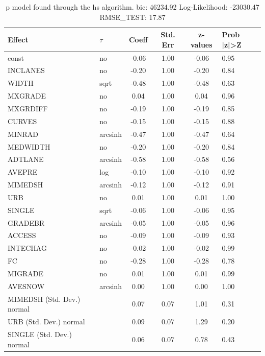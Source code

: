 \begin{table}
	\caption{p model found through the hs algorithm. bic: 46234.92 Log-Likelihood: -23030.47 RMSE_TEST: 17.87}
	\begin{center}
		\begin{tabular}{|l|l|c|c|c|l|}
			\hline
			Effect & $\tau$ & Coeff & Std. Err & z-values & Prob |z|>Z \\
			\hline
			const & no & -0.06 & 1.00 & -0.06 & 0.95 \\
			\hline
			INCLANES & no & -0.20 & 1.00 & -0.20 & 0.84 \\
			\hline
			WIDTH & sqrt & -0.48 & 1.00 & -0.48 & 0.63 \\
			\hline
			MXGRADE & no & 0.04 & 1.00 & 0.04 & 0.96 \\
			\hline
			MXGRDIFF & no & -0.19 & 1.00 & -0.19 & 0.85 \\
			\hline
			CURVES & no & -0.15 & 1.00 & -0.15 & 0.88 \\
			\hline
			MINRAD & arcsinh & -0.47 & 1.00 & -0.47 & 0.64 \\
			\hline
			MEDWIDTH & no & -0.20 & 1.00 & -0.20 & 0.84 \\
			\hline
			ADTLANE & arcsinh & -0.58 & 1.00 & -0.58 & 0.56 \\
			\hline
			AVEPRE & log & -0.10 & 1.00 & -0.10 & 0.92 \\
			\hline
			MIMEDSH & arcsinh & -0.12 & 1.00 & -0.12 & 0.91 \\
			\hline
			URB & no & 0.01 & 1.00 & 0.01 & 1.00 \\
			\hline
			SINGLE & sqrt & -0.06 & 1.00 & -0.06 & 0.95 \\
			\hline
			GRADEBR & arcsinh & -0.05 & 1.00 & -0.05 & 0.96 \\
			\hline
			ACCESS & no & -0.09 & 1.00 & -0.09 & 0.93 \\
			\hline
			INTECHAG & no & -0.02 & 1.00 & -0.02 & 0.99 \\
			\hline
			FC & no & -0.28 & 1.00 & -0.28 & 0.78 \\
			\hline
			MIGRADE & no & 0.01 & 1.00 & 0.01 & 0.99 \\
			\hline
			AVESNOW & arcsinh & 0.00 & 1.00 & 0.00 & 1.00 \\
			\hline
			MIMEDSH (Std. Dev.) normal &  & 0.07 & 0.07 & 1.01 & 0.31 \\
			\hline
			URB (Std. Dev.) normal &  & 0.09 & 0.07 & 1.29 & 0.20 \\
			\hline
			SINGLE (Std. Dev.) normal &  & 0.06 & 0.07 & 0.78 & 0.43 \\

\end{tabular}
\end{center}
\end{table}
